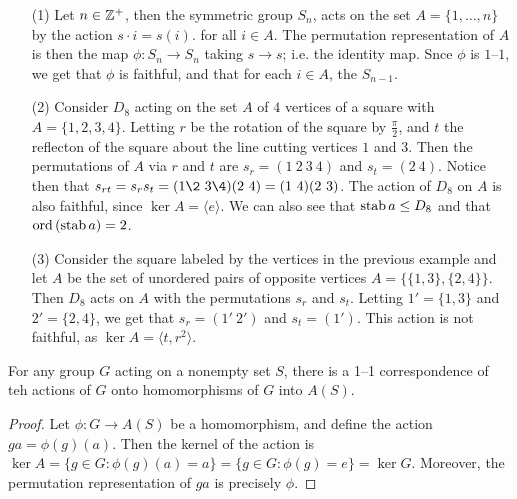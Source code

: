 \begin{example}\label{example_4.3}
  \begin{enumerate}
    \item[(1)] Let $n \in \mathbb{Z}^+$, then the symmetric group $S_n$, acts on the
      set $A=\{1, \dots, n\}$ by the action $s \cdot i=s(i)$. for all $i
      \in A$. The permutation representation of $A$ is then the map
      $\phi:S_n \rightarrow S_n$ taking $s \rightarrow s$; i.e. the
      identity map. Snce $\phi$ is  $1$--$1$, we get that $\phi$ is
      faithful, and that for each $i \in A$, the  \simeq
      $S_{n-1}$.

    \item[(2)] Consider $D_8$ acting on the set $A$ of  $4$ vertices of a
      square with  $A=\{1,2,3,4\}$. Letting $r$ be the rotation of the square
      by  $\frac{\pi}{2}$, and $t$ the reflecton of the square about the
      line cutting vertices $1$ and $3$. Then the permutations of $A$ via
      $r$ and  $t$ are  $s_r=(1 \ 2 \ 3 \ 4)$ and $s_t = (2 \ 4)$. Notice then
      that $s_{rt}=s_rs_t=(1 \2 \ 3 \4)(2 \ 4)=(1 \ 4)(2 \ 3)$. The action of
      $D_8$ on $A$ is also faithful, since  $\ker{A}=\langle e \rangle$. We can also
      see that $\operatorname{stab}{a} \leq D_8$ and that $\operatorname{ord}{(\operatorname{stab}{a})}=2$.

    \item[(3)] Consider the square labeled by the vertices in the
      previous example and let $A$ be the set of unordered pairs of opposite
      vertices  $A=\{\{1,3\}, \{2,4\}\}$. Then $D_8$ acts on $A$ with the
      permutations $s_r$ and  $s_t$. Letting  $1'=\{1,3\}$ and $2'=\{2,4\}$,
      we get that $s_r=(1' \ 2')$ and $s_t=(1')$. This action is not faithful,
      as $\ker{A}=\langle t ,r^2 \rangle$.
  \end{enumerate}
\end{example}

\begin{theorem}\label{lemma_4.1.3}
  For any group $G$ acting on a nonempty set $S$, there is a 1--1 correspondence
  of teh actions of  $G$ onto homomorphisms of  $G$ into $A(S)$.
\end{theorem}
\begin{proof}
  Let $\phi:G \rightarrow A(S)$ be a homomorphism, and define the action
  $ga=\phi(g)(a)$. Then the kernel of the action is $\ker{A}=\{g \in G :
  \phi(g)(a)=a\}=\{g \in G : \phi(g)=e\}=\ker{G}$. Moreover, the permutation
  representation of $ga$ is precisely  $\phi$.
\end{proof}

